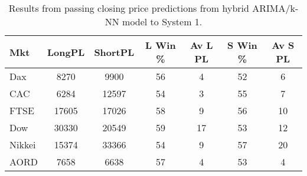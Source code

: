 \begin{table}[ht]
\centering
\caption[Results from passing closing price predictions from hybrid ARIMA/k-NN model to System 1]{Results from passing closing price predictions from hybrid ARIMA/k-NN model to System 1.} 
\label{tab:chp_ts:pred_close_arima_knn_sys1}
\begin{tabular}{lcccccc}
  \toprule Mkt & LongPL & ShortPL & L Win \% & Av L PL & S Win \% & Av S PL \\ 
  \midrule Dax & 8270 & 9900 & 56 & 4 & 52 & 6 \\ 
  CAC & 6284 & 12597 & 54 & 3 & 55 & 7 \\ 
  FTSE & 17605 & 17026 & 58 & 9 & 56 & 10 \\ 
  Dow & 30330 & 20549 & 59 & 17 & 53 & 12 \\ 
  Nikkei & 15374 & 33366 & 54 & 9 & 57 & 20 \\ 
  AORD & 7658 & 6638 & 57 & 4 & 53 & 4 \\ 
   \bottomrule \end{tabular}
\end{table}
